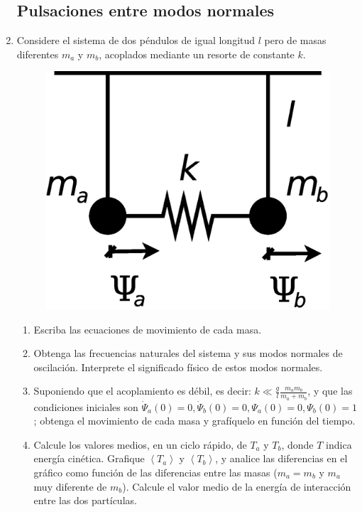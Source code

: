 \documentclass[11pt,spanish,a4paper]{article}
\begin{document}
\begin{enumerate}
\subsection*{Pulsaciones entre modos normales}

\item Considere el sistema de dos péndulos de igual longitud $l$ pero de
masas diferentes $m_{a}$ y $m_{b}$, acoplados mediante un resorte
de constante $k$. 
\begin{figure}[H]
\centering{}\includegraphics[clip,scale=0.3]{ej1-7}
\end{figure}


\begin{enumerate}
\item Escriba las ecuaciones de movimiento de cada masa. 
\item Obtenga las frecuencias naturales del sistema y sus modos normales
de oscilación. Interprete el significado físico de estos modos normales. 
\item Suponiendo que el acoplamiento es débil, es decir: $k\ll\frac{g}{l}\frac{m_{a}m_{b}}{m_{a}+m_{b}}$,
y que las condiciones iniciales son $\dot{\Psi}_{a}(0)=0,\dot{\Psi}_{b}(0)=0,\Psi_{a}(0)=0,\Psi_{b}(0)=1$;
obtenga el movimiento de cada masa y grafíquelo en función del tiempo. 
\item Calcule los valores medios, en un ciclo rápido, de $T_{a}$ y $T_{b}$,
donde $T$ indica energía cinética. Grafique $\left\langle T_{a}\right\rangle $
y $\left\langle T_{b}\right\rangle $, y analice las diferencias en
el gráfico como función de las diferencias entre las masas ($m_{a}=m_{b}$
y $m_{a}$ muy diferente de $m_{b}$). Calcule el valor medio de la
energía de interacción entre las dos partículas.
\end{enumerate}



\end{enumerate}
\end{document}
